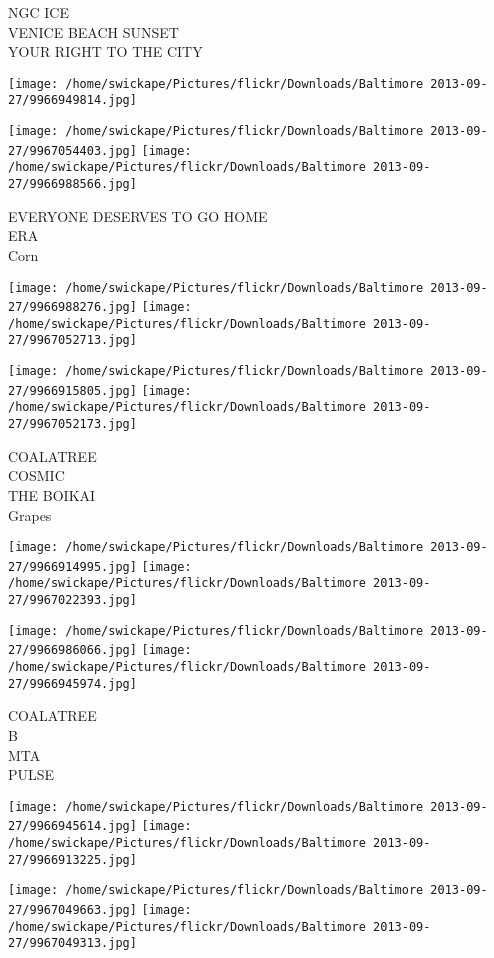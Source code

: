 \documentclass[10pt,letterpaper]{article}
\begin{document}
NGC ICE\\
VENICE BEACH SUNSET\\
YOUR RIGHT TO THE CITY
\pagebreak

\texttt{[image: /home/swickape/Pictures/flickr/Downloads/Baltimore 2013-09-27/9966949814.jpg]}

\vspace{0.25in}
\texttt{[image: /home/swickape/Pictures/flickr/Downloads/Baltimore 2013-09-27/9967054403.jpg]}
\texttt{[image: /home/swickape/Pictures/flickr/Downloads/Baltimore 2013-09-27/9966988566.jpg]}

EVERYONE DESERVES TO GO HOME\\
ERA\\
Corn
\pagebreak

\texttt{[image: /home/swickape/Pictures/flickr/Downloads/Baltimore 2013-09-27/9966988276.jpg]}
\texttt{[image: /home/swickape/Pictures/flickr/Downloads/Baltimore 2013-09-27/9967052713.jpg]}

\texttt{[image: /home/swickape/Pictures/flickr/Downloads/Baltimore 2013-09-27/9966915805.jpg]}
\texttt{[image: /home/swickape/Pictures/flickr/Downloads/Baltimore 2013-09-27/9967052173.jpg]}

COALATREE\\
COSMIC\\
THE BOIKAI\\
Grapes
\pagebreak

\texttt{[image: /home/swickape/Pictures/flickr/Downloads/Baltimore 2013-09-27/9966914995.jpg]}
\texttt{[image: /home/swickape/Pictures/flickr/Downloads/Baltimore 2013-09-27/9967022393.jpg]}

\texttt{[image: /home/swickape/Pictures/flickr/Downloads/Baltimore 2013-09-27/9966986066.jpg]}
\texttt{[image: /home/swickape/Pictures/flickr/Downloads/Baltimore 2013-09-27/9966945974.jpg]}

COALATREE\\
B\\
MTA\\
PULSE
\pagebreak

\texttt{[image: /home/swickape/Pictures/flickr/Downloads/Baltimore 2013-09-27/9966945614.jpg]}
\texttt{[image: /home/swickape/Pictures/flickr/Downloads/Baltimore 2013-09-27/9966913225.jpg]}

\texttt{[image: /home/swickape/Pictures/flickr/Downloads/Baltimore 2013-09-27/9967049663.jpg]}
\texttt{[image: /home/swickape/Pictures/flickr/Downloads/Baltimore 2013-09-27/9967049313.jpg]}
\end{document}
